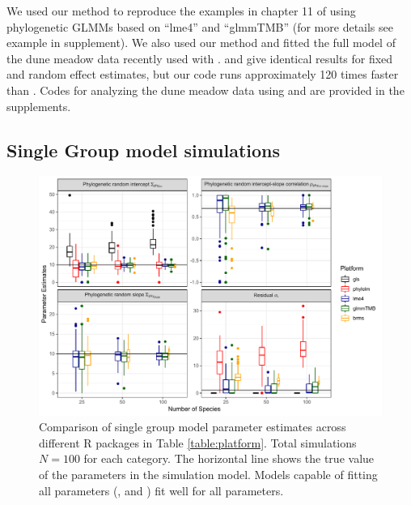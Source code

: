 \documentclass[12pt]{article}
\begin{document}
We used our method to reproduce the examples in chapter 11 of \cite{garamszegi2014modern} using phylogenetic GLMMs based on ``lme4'' and ``glmmTMB'' (for more details see example in supplement).
We also used our method and fitted the full model of the dune meadow data recently used with  \citep{li2017canfun}. 
 and  give identical results for fixed and random effect estimates, but our code runs approximately 120 times faster than . 
Codes for analyzing the dune meadow data using  and  are provided in the supplements. 

\subsection*{Single Group model simulations}

\begin{center}
\begin{figure}[H]
  \includegraphics[scale=0.7,page=1]{./figure/ssplot.pdf}
  \caption{Comparison of single group model parameter estimates across different R packages in Table \ref{table:platform}. Total simulations $N=100$ for each category. The horizontal line shows the true value of the parameters in the simulation model. Models capable of fitting all parameters (,  and ) fit well for all parameters. 
}
\label{ssplot}
\end{figure}
\end{center}
\end{document}
